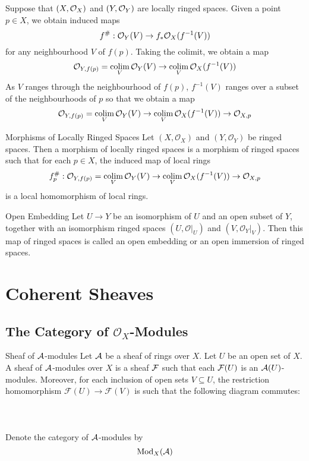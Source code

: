 \documentclass[a4paper]{article}
\begin{document}
Suppose that $(X,\mathcal{O}_X)$ and $(Y,\mathcal{O}_Y)$ are locally ringed spaces. Given a point $p\in X$, we obtain induced maps $$f^\#:\mathcal{O}_Y(V)\to f_\ast\mathcal{O}_X(f^{-1}(V))$$ for any neighbourhood $V$ of $f(p)$. Taking the colimit, we obtain a map $$\mathcal{O}_{Y,f(p)}=\operatorname*{colim}_V\mathcal{O}_Y(V)\to\operatorname*{colim}_V\mathcal{O}_X(f^{-1}(V))$$ As $V$ ranges through the neighbourhood of $f(p)$, $f^{-1}(V)$ ranges over a subset of the neighbourhoods of $p$ so that we obtain a map $$\mathcal{O}_{Y,f(p)}=\operatorname*{colim}_V\mathcal{O}_Y(V)\to\operatorname*{colim}_V\mathcal{O}_X(f^{-1}(V))\to\mathcal{O}_{X,p}$$

\begin{defn}{Morphisms of Locally Ringed Spaces}{} Let $(X,\mathcal{O}_X)$ and $(Y,\mathcal{O}_Y)$ be ringed spaces. Then a morphism of locally ringed spaces is a morphism of ringed spaces such that for each $p\in X$, the induced map of local rings $$f_p^\#:\mathcal{O}_{Y,f(p)}=\operatorname*{colim}_V\mathcal{O}_Y(V)\to\operatorname*{colim}_V\mathcal{O}_X(f^{-1}(V))\to\mathcal{O}_{X,p}$$ is a local homomorphism of local rings. 
\end{defn}

\begin{defn}{Open Embedding}{} Let $U\to Y$ be an isomorphism of $U$ and an open subset of $Y$, together with an isomorphism ringed spaces $(U,\mathcal{O}|_U)$ and $(V,\mathcal{O}_Y|_V)$. Then this map of ringed spaces is called an open embedding or an open immersion of ringed spaces. 
\end{defn}

\pagebreak
\section{Coherent Sheaves}
\subsection{The Category of $\mathcal{O}_X$-Modules}
\begin{defn}{Sheaf of $\mathcal{A}$-modules}{} Let $\mathcal{A}$ be a sheaf of rings over $X$. Let $U$ be an open set of $X$. A sheaf of $\mathcal{A}$-modules over $X$ is a sheaf $\mathcal{F}$ such that each $\mathcal{F}(U)$ is an $\mathcal{A}(U)$-modules. Moreover, for each inclusion of open sets $V\subseteq U$, the restriction homomorphism $\mathcal{F}(U)\to\mathcal{F}(V)$ is such that the following diagram commutes: \\~\\
\\~\\
Denote the category of $\mathcal{A}$-modules by $$\text{Mod}_X(\mathcal{A})$$
\end{defn}
\end{document}
